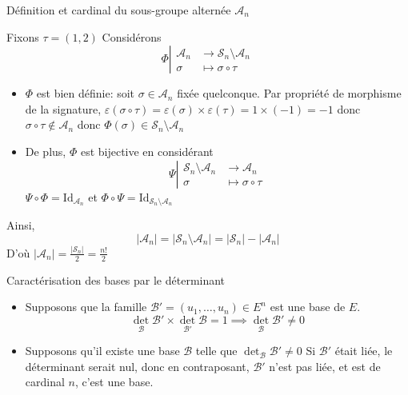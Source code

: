 \documentclass{article}
\renewenvironment{question_kholle}[2][ ]
{
	\subsection{\texorpdfstring{#2}{}}
	\notblank{#1}
	{
		\noindent #1
		\bigbreak
	}
	{}
	\begin{proof}
}
{
	\end{proof}
}
\begin{document}
\begin{question_kholle}[{Le noyau d'un morphisme de groupe étant toujours un sous-groupe du groupe de départ, le groupe alterné d'indice $n \in \N^{*}$ est le sous groupe de $(\mathcal{S}_{n}, \circ)$ obtenu en considérant le noyau du morphisme signature.
        $$
          \mathcal{A}_{n}= \ker \varepsilon
        $$
        $\mathcal{A}_{n}$ est de cardinal $\frac{n!}{2}$.
      }]{Définition et cardinal du sous-groupe alternée $\mathcal{A}_n$}


  Fixons $\tau = (1, 2)$
  Considérons
  $$\Phi \left|\begin{array}{ll} \mathcal{A}_{n} &\to \mathcal{S}_{n} \setminus \mathcal{A}_{n} \\ \sigma &\mapsto \sigma \circ \tau \end{array}\right.$$
  \begin{itemize}
    \item

          $\Phi$ est bien définie: soit $\sigma \in \mathcal{A}_{n}$ fixée quelconque. Par propriété de morphisme de la signature, $\varepsilon(\sigma \circ \tau) = \varepsilon(\sigma) \times \varepsilon(\tau) = 1 \times (-1) = -1$ donc $\sigma \circ \tau \not\in \mathcal{A}_{n}$ donc $\Phi(\sigma) \in \mathcal{S}_{n}\setminus \mathcal{A}_{n}$

    \item De plus, $\Phi$ est bijective en considérant
          $$\Psi\left|\begin{array}{ll} \mathcal{S}_{n}\setminus \mathcal{A}_{n} &\to \mathcal{A}_{n} \\ \sigma &\mapsto \sigma \circ  \tau \end{array}\right.$$
          $\Psi \circ \Phi = \mathrm{Id}_{\mathcal{A}_{n}}$ et $\Phi \circ \Psi = \mathrm{Id}_{\mathcal{S}_{n}\setminus \mathcal{A}_{n}}$
  \end{itemize}
  Ainsi,
  $$
    \lvert \mathcal{A}_{n} \rvert  = \lvert \mathcal{S}_{n}\setminus \mathcal{A}_{n} \rvert  = \lvert \mathcal{S}_{n} \rvert - \lvert \mathcal{A}_{n} \rvert
  $$
  D'où $\lvert \mathcal{A}_{n} \rvert = \frac{\lvert \mathcal{S}_{n} \rvert}{2} = \frac{n!}{2}$
\end{question_kholle}

\begin{question_kholle}{Caractérisation des bases par le déterminant}
  ~\\
  \begin{itemize}[label=$\star$]
    \item Supposons que la famille $\mathcal{B'} =(u_{1}, \dots, u_{n}) \in E^{n}$ est une base de $E$.
          $$\det_{\mathcal{B}}\mathcal{B'}\times \det_{\mathcal{B'}}\mathcal{B} = 1 \implies \det _{\mathcal{B}}\mathcal{B'} \neq 0$$

    \item Supposons qu'il existe une base $\mathcal{B}$ telle que $\det_{\mathcal{B}} \mathcal{B}' \neq 0$
          Si $\mathcal{B}'$ était liée, le déterminant serait nul, donc en contraposant, $\mathcal{B}'$ n'est pas liée, et est de cardinal $n$, c'est une base.
  \end{itemize}
\end{question_kholle}
\end{document}
